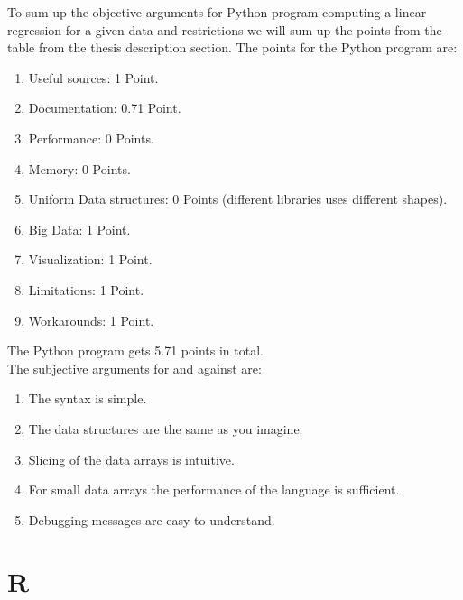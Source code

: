 \documentclass[
  twoside,
  12pt, a4paper,
  footinclude=true,
  headinclude=true,
  cleardoublepage=empty
]{article}
\begin{document}
To sum up the objective arguments for Python program computing a linear regression for a given data and restrictions we will sum up the points from the table from the thesis description section.
The points for the Python program are:
\begin{enumerate}
    \item Useful sources: 1 Point.
    \item Documentation: 0.71 Point.
    \item Performance: 0 Points.
    \item Memory: 0 Points.
    \item Uniform Data structures: 0 Points (different libraries uses different shapes).
    \item Big Data: 1 Point.
    \item Visualization: 1 Point.
    \item Limitations: 1 Point.
    \item Workarounds: 1 Point.
\end{enumerate} 
The Python program gets 5.71 points in total.\\
The subjective arguments for and against are: 
\begin{enumerate}
    \item The syntax is simple.
    \item The data structures are the same as you imagine.
    \item Slicing of the data arrays is intuitive.
    \item For small data arrays the performance of the language is sufficient.
    \item Debugging messages are easy to understand.
\end{enumerate}  

\newpage
\section{R}
\end{document}

